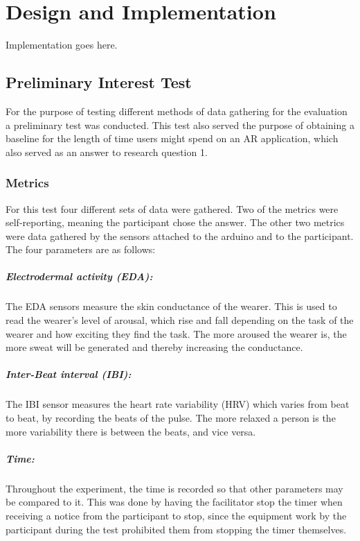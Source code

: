 \chapter{Design and Implementation}\label{ch:implementation}
Implementation goes here.

\section{Preliminary Interest Test}
For the purpose of testing different methods of data gathering for the evaluation a preliminary test was conducted. This test also served the purpose of obtaining a baseline for the length of time users might spend on an AR application, which also served as an answer to research question 1.

\subsection{Metrics}\label{subsec:premetrics}
For this test four different sets of data were gathered. Two of the metrics were self-reporting, meaning the participant chose the answer. The other two metrics were data gathered by the sensors attached to the arduino and to the participant. The four parameters are as follows:
\paragraph{Electrodermal activity (EDA):} The EDA sensors measure the skin conductance of the wearer. This is used to read the wearer’s level of arousal, which rise and fall depending on the task of the wearer and how exciting they find the task. The more aroused the wearer is, the more sweat will be generated and thereby increasing the conductance.
\paragraph{Inter-Beat interval (IBI):} The IBI sensor measures the heart rate variability (HRV) which varies from beat to beat, by recording the beats of the pulse. The more relaxed a person is the more variability there is between the beats, and vice versa. 
\paragraph{Time:} Throughout the experiment, the time is recorded so that other parameters may be compared to it. This was done by having the facilitator stop the timer when receiving a notice from the participant to stop, since the equipment work by the participant during the test prohibited them from stopping the timer themselves.
